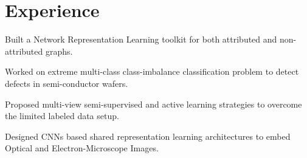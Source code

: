 \documentclass[]{deedy-resume-openfont}
\begin{document}
\section{Experience}
\begin{tightemize}
\item Built a Network Representation Learning toolkit for both attributed and non-attributed graphs.
\end{tightemize}
{}
\begin{tightemize}
\item Worked on extreme multi-class class-imbalance classification problem to detect defects in semi-conductor wafers.
\item Proposed multi-view semi-supervised and active learning strategies to overcome the limited labeled data setup.
\item Designed CNNs based shared representation learning architectures to embed Optical and Electron-Microscope Images.
\end{tightemize}
\end{document}
